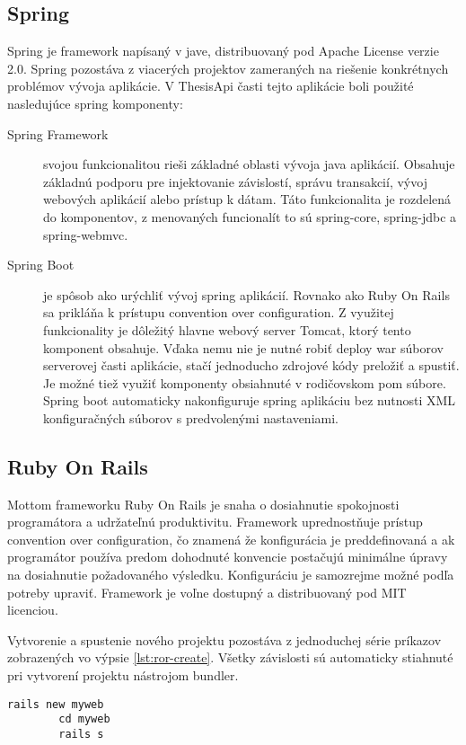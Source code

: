 	\subsection{Spring}
	Spring je framework napísaný v jave, distribuovaný pod Apache License verzie 2.0. Spring pozostáva z viacerých projektov zameraných na riešenie konkrétnych problémov vývoja aplikácie. V ThesisApi časti tejto aplikácie boli použité nasledujúce spring komponenty:
	\begin{description}
		\item[Spring Framework] svojou funkcionalitou rieši základné oblasti vývoja java aplikácií. Obsahuje základnú podporu pre injektovanie závislostí, správu transakcií, vývoj webových aplikácií alebo prístup k dátam. Táto funkcionalita je rozdelená do komponentov, z menovaných funcionalít to sú spring-core, spring-jdbc a spring-webmvc.
		
		\item[Spring Boot] je spôsob ako urýchliť vývoj spring aplikácií. Rovnako ako Ruby On Rails sa prikláňa k prístupu convention over configuration. Z využitej funkcionality je dôležitý hlavne webový server Tomcat, ktorý tento komponent obsahuje. Vďaka nemu nie je nutné robiť deploy war súborov serverovej časti aplikácie, stačí jednoducho zdrojové kódy preložiť a spustiť. Je možné tiež využiť komponenty obsiahnuté v rodičovskom pom súbore. Spring boot automaticky nakonfiguruje spring aplikáciu bez nutnosti XML konfiguračných súborov s predvolenými nastaveniami.
	\end{description}
		
	\subsection{Ruby On Rails}
	Mottom frameworku Ruby On Rails je snaha o dosiahnutie spokojnosti programátora a udržateľnú produktivitu. Framework uprednostňuje prístup convention over configuration, čo znamená že konfigurácia je preddefinovaná a ak programátor používa predom dohodnuté konvencie postačujú minimálne úpravy na dosiahnutie požadovaného výsledku. Konfiguráciu je samozrejme možné podľa potreby upraviť. Framework je voľne dostupný a distribuovaný pod MIT licenciou.
	
	Vytvorenie a spustenie nového projektu pozostáva z jednoduchej série príkazov zobrazených vo výpsie \ref{lst:ror-create}. Všetky závislosti sú automaticky stiahnuté pri vytvorení projektu nástrojom bundler.
	\begin{lstlisting}[label=lst:ror-create,caption=Príklad vytvorenia a spustenia projektu v Ruby On Rails]
		rails new myweb
		cd myweb
		rails s
	\end{lstlisting}

